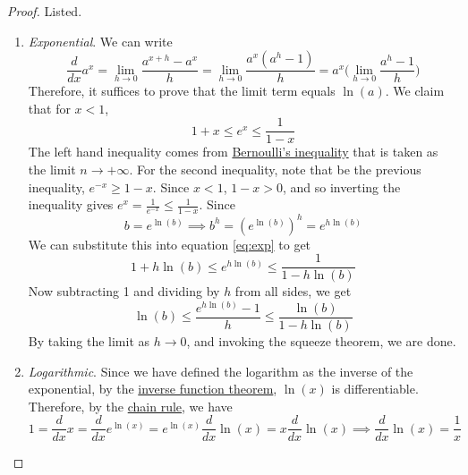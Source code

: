   \begin{proof}
    Listed. 
    \begin{enumerate}
      \item \textit{Exponential}. We can write 
        \begin{equation}
          \frac{d}{dx} a^x = \lim_{h \to 0} \frac{a^{x + h} - a^x}{h} = \lim_{h \to 0} \frac{a^x (a^h - 1)}{h} = a^x \bigg( \lim_{h \to 0} \frac{a^h - 1}{h} \bigg)
        \end{equation}
        Therefore, it suffices to prove that the limit term equals $\ln(a)$. We claim that for $x < 1$, 
        \begin{equation}
          \label{eq:exp}
          1 + x \leq e^x \leq \frac{1}{1 - x} 
        \end{equation}
        The left hand inequality comes from \hyperref[thm:bernoullis-inequality]{Bernoulli's inequality} that is taken as the limit $n \to +\infty$. For the second inequality, note that be the previous inequality, $e^{-x} \geq 1 - x$. Since $x < 1$, $1 - x > 0$, and so inverting the inequality gives $e^x = \frac{1}{e^{-x}} \leq \frac{1}{1 - x}$. Since 
        \begin{equation}
          b = e^{\ln(b)}  \implies b^h = (e^{\ln(b)})^h  = e^{h \ln(b)}
        \end{equation} 
        We can substitute this into equation \ref{eq:exp} to get 
        \begin{equation}
          1 + h \ln(b) \leq e^{h \ln(b)} \leq \frac{1}{1 - h \ln(b)} 
        \end{equation}
        Now subtracting 1 and dividing by $h$ from all sides, we get 
        \begin{equation}
          \ln(b) \leq \frac{e^{h \ln(b)} - 1}{h} \leq \frac{\ln(b)}{1 - h \ln(b)} 
        \end{equation}
        By taking the limit as $h \to 0$, and invoking the squeeze theorem, we are done. 

      \item \textit{Logarithmic}. Since we have defined the logarithm as the inverse of the exponential, by the \hyperref[thm:inverse-ft]{inverse function theorem}, $\ln(x)$ is differentiable. Therefore, by the \hyperref[thm:chain]{chain rule}, we have 
        \begin{equation}
          1 = \frac{d}{dx} x = \frac{d}{dx} e^{\ln(x)} = e^{\ln(x)} \frac{d}{dx} \ln(x) = x \frac{d}{dx} \ln(x) \implies \frac{d}{dx} \ln(x) = \frac{1}{x}
        \end{equation}
    \end{enumerate}
  \end{proof}

